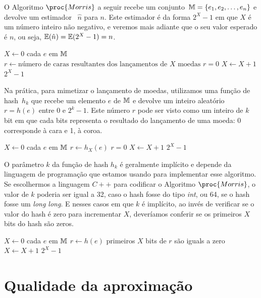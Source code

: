 O Algoritmo $\proc{Morris}$ a seguir recebe um conjunto~$\mathbb{M} = \{ e_1, e_2, \dots, e_n \}$ e devolve um estimador~
$\hat{n}$ para $n$. Este estimador é da forma $2^{X} - 1$ em que $X$ é um número inteiro não negativo, e veremos mais 
adiante que o seu valor esperado é $n$, ou seja, $\mathbb{E}(\hat{n}) = \mathbb{E}(2^{X} - 1) = n$.

\begin{codebox}
  \li $X \gets 0$
  \li \For cada $e$ em $\mathbb{M}$ 
  \li \Do
      $r \gets \text{número de caras resultantes dos lançamentos de $X$ moedas}$ 
  \li   \If $r = 0$
  \li   \Do
          $X \gets X + 1$
        \End
      \End
  \li
  \Return $2^{X} - 1$   
  \End
\end{codebox}

Na prática, para mimetizar o lançamento de moedas, utilizamos uma função de hash~$h_k$ que recebe um elemento $e$ de 
$\mathbb{M}$ e devolve um inteiro aleatório $r = h(e)$ entre 0 e $2^{k} - 1$. Este número $r$ pode ser visto como um inteiro 
de $k$ bit em que cada bits representa o resultado do lançamento de uma moeda: 0 corresponde à cara e 1, à coroa. 

\begin{codebox}
  \li $X \gets 0$
  \li \For cada $e$ em $\mathbb{M}$ 
  \li \Do
      $r \gets h_{X}(e)$ 
  \li   \If $r = 0$
  \li   \Do
          $X \gets X + 1$
        \End
      \End
  \li
  \Return $2^{X} - 1$   
  \End
\end{codebox}

O parâmetro $k$ da função de hash $h_{k}$ é geralmente implícito e depende da linguagem de programação que estamos 
usando para implementar esse algoritmo. Se escolhermos a linguagem $C{+}{+}$ para codificar o Algoritmo $\proc{Morris}$, 
o valor de $k$ poderia ser igual a 32, caso o hash fosse do tipo \textit{int}, ou 64, se o hash fosse um 
\textit{long long}. E nesses casos em que $k$ é implícito, ao invés de verificar se o valor do hash é zero para 
incrementar $X$, deveríamos conferir se os primeiros $X$ bits do hash são zeros.

\begin{codebox}
  \li $X \gets 0$
  \li \For cada $e$ em $\mathbb{M}$ 
  \li \Do
      $r \gets h(e)$ 
  \li   \If primeiros $X$ bits de $r$ são iguals a zero
  \li   \Do
          $X \gets X + 1$
        \End
      \End
  \li
  \Return $2^{X} - 1$   
  \End
\end{codebox}

\section{Qualidade da aproximação}
\label{sec:morris:analysis}

